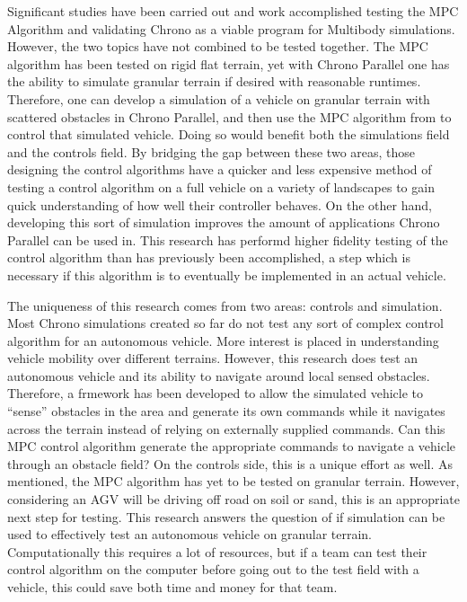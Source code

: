 \documentclass[12pt,onecolumn]{article}
\begin{document}
Significant studies have been carried out and work accomplished testing the MPC Algorithm and validating Chrono as a viable program for Multibody simulations. However, the two topics have not combined to be tested together. The MPC algorithm has been tested on rigid flat terrain, yet with Chrono Parallel one has the ability to simulate granular terrain if desired with reasonable runtimes. Therefore, one can develop a simulation of a vehicle on granular terrain with scattered obstacles in Chrono Parallel, and then use the MPC algorithm from \cite{ModelFidelity2016} to control that simulated vehicle. Doing so would benefit both the simulations field and the controls field. By bridging the gap between these two areas, those designing the control algorithms have a quicker and less expensive method of testing a control algorithm on a full vehicle on a variety of landscapes to gain quick understanding of how well their controller behaves. On the other hand, developing this sort of simulation improves the amount of applications Chrono Parallel can be used in. This research has performd higher fidelity testing of the control algorithm than has previously been accomplished, a step which is necessary if this algorithm is to eventually be implemented in an actual vehicle. 

	The uniqueness of this research comes from two areas: controls and simulation. Most Chrono simulations created so far do not test any sort of complex control algorithm for an autonomous vehicle. More interest is placed in understanding vehicle mobility over different terrains. However, this research does test an autonomous vehicle and its ability to navigate around local sensed obstacles. Therefore, a frmework has been developed to allow the simulated vehicle to “sense” obstacles in the area and generate its own commands while it navigates across the terrain instead of relying on externally supplied commands. Can this MPC control algorithm generate the appropriate commands to navigate a vehicle through an obstacle field? On the controls side, this is a unique effort as well. As mentioned, the MPC algorithm has yet to be tested on granular terrain. However, considering an AGV will be driving off road on soil or sand, this is an appropriate next step for testing. This research answers the question of if simulation can be used to effectively test an autonomous vehicle on granular terrain. Computationally this requires a lot of resources, but if a team can test their control algorithm on the computer before going out to the test field with a vehicle, this could save both time and money for that team.
\end{document}
